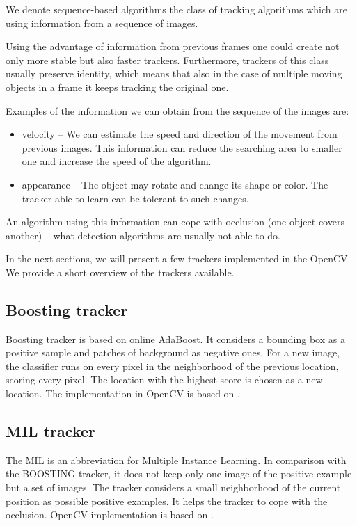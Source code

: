 We denote sequence-based algorithms the class of tracking algorithms which
are using information from a sequence of images.

Using the advantage of information from previous frames one could create not
only more stable but also faster trackers. Furthermore, trackers of this class
usually preserve identity, which means that also in the case of multiple moving
objects in a frame it keeps tracking the original one.

Examples of the information we can obtain from the sequence of the images are:
\begin{itemize}
\item velocity -- We can estimate the speed and direction of
  the movement from previous images. This information can reduce the searching area to smaller one
  and increase the speed of the algorithm.
\item appearance -- The object may rotate and change its shape or color. The tracker able to
  learn can be tolerant to such changes.
\end{itemize}

An algorithm using this information can cope with occlusion (one object covers
another) -- what detection algorithms are usually not able to do.

In the next sections, we will present a few trackers implemented in the OpenCV. We
provide a short overview of the trackers available.

\subsection*{Boosting tracker}
Boosting tracker is based on online AdaBoost. It considers a bounding box as a
positive sample and patches of background as negative ones. For a new image,
the classifier runs on every pixel in the neighborhood of the previous
location, scoring every pixel. The location with the highest score is chosen as
a new location. The implementation in OpenCV is based on \citet*{boosting}.

\subsection*{MIL tracker}
The MIL is an abbreviation for Multiple Instance Learning. In comparison with
the BOOSTING tracker, it does not keep only one image of the positive example
but a set of images. The tracker considers a small neighborhood of the current
position as possible positive examples. It helps the tracker to cope with the
occlusion. OpenCV implementation is based on \citet*{mil}.


